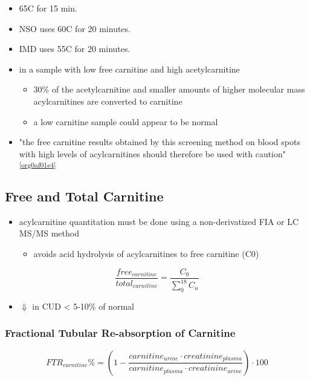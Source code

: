 \documentclass[12pt]{scrartcl}
\begin{document}
\begin{itemize}
\item 65\degree{}C for 15 min.
\item NSO uses 60\degree{}C for 20 minutes.
\item IMD uses 55\degree{}C for 20 minutes.

\item in a sample with low free carnitine and high acetylcarnitine
\begin{itemize}
\item 30\% of the acetylcarnitine and smaller amounts of higher
molecular mass acylcarnitines are converted to carnitine
\item a low carnitine sample could appear to be normal
\end{itemize}
\item "the free carnitine results obtained by this screening method on
blood spots with high levels of acylcarnitines should therefore be
used with caution" \textsuperscript{\ref{org0af01e4}}
\end{itemize}


\subsection{Free and Total Carnitine}
\label{sec:orga8482dd}
\begin{itemize}
\item acylcarnitine quantitation must be done using a non-derivatized FIA
or LC MS/MS method
\begin{itemize}
\item avoids acid hydrolysis of acylcarnitines to free carnitine (C0)
\end{itemize}
\end{itemize}

\[
\frac{free_{carnitine}}{total_{carnitine}} = \frac{C_0}{\sum_{0}^{18} C_n}
\]

\begin{itemize}
\item \(\Downarrow\) in CUD \textless{} 5-10\% of normal
\end{itemize}


\subsubsection{Fractional Tubular Re-absorption of Carnitine}
\label{sec:orgd0d4510}

\begin{equation*}
FTR_{carnitine}\% = \left( 1 -  \frac{carnitine_{urine} \cdot creatinine_{plasma}}{carnitine_{plasma} \cdot creatinine_{urine}}\right) \cdot 100
\end{equation*}
\end{document}
